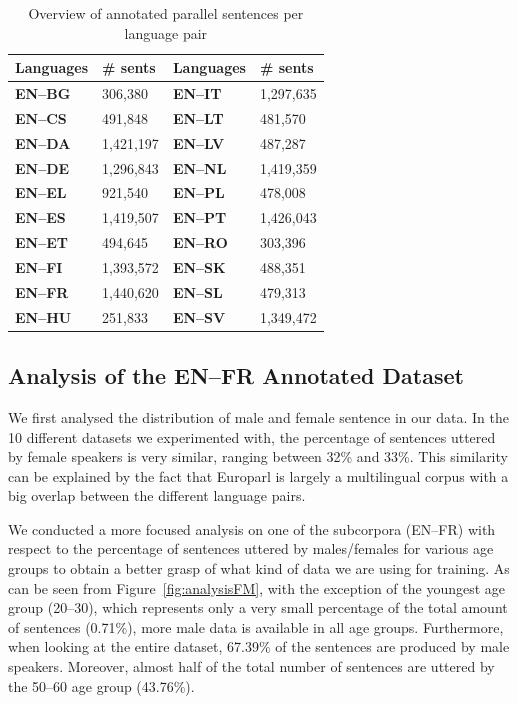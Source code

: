 \begin{table}[h!]
\centering
\footnotesize\begin{tabular}{|ll|ll|}
\hline
\bf{Languages}  &   \bf{\# sents}    &  \bf{Languages}  &   \bf{\# sents}   \\ \hline
\bf{EN--BG}	&	306,380	    &   \bf{EN--IT}	&	1,297,635	\\ \hline
\bf{EN--CS}	&	491,848	    &	\bf{EN--LT}	&	481,570	    \\ \hline
\bf{EN--DA}	&	1,421,197	&	\bf{EN--LV}	&	487,287	    \\ \hline
\bf{EN--DE} &	1,296,843	&	\bf{EN--NL}	&	1,419,359	\\ \hline
\bf{EN--EL}	&	921,540	    &	\bf{EN--PL}	&	478,008	    \\ \hline
\bf{EN--ES}	&	1,419,507	&	\bf{EN--PT}	&	1,426,043	\\ \hline
\bf{EN--ET}	&	494,645	    &	\bf{EN--RO}	&	303,396	    \\ \hline
\bf{EN--FI} &	1,393,572	&	\bf{EN--SK}	&	488,351	    \\ \hline
\bf{EN--FR}	&	1,440,620	&	\bf{EN--SL}	&	479,313	    \\ \hline
\bf{EN--HU}	&	251,833	    &	\bf{EN--SV}	&	1,349,472	\\ \hline

\end{tabular}
\caption{Overview of annotated parallel sentences per language pair}\label{tbl:numberSents}
\end{table}

\subsection{Analysis of the EN--FR Annotated Dataset}

We first analysed the distribution of male and female sentence in our data. In the 10 different datasets we experimented with, the percentage of sentences uttered by female speakers is very similar, ranging between 32\% and 33\%. This similarity can be explained by the fact that Europarl is largely a multilingual corpus with a big overlap between the different language pairs.

We conducted a more focused analysis on one of the subcorpora (EN--FR) with respect to the percentage of sentences uttered by males/females for various age groups to obtain a better grasp of what kind of data we are using for training. As can be seen from Figure~\ref{fig:analysisFM}, with the exception of the youngest age group (20--30), which represents only a very small percentage of the total amount of sentences (0.71\%), more male data is available in all age groups. Furthermore, when looking at the entire dataset, 67.39\% of the sentences are produced by male speakers. Moreover, almost half of the total number of sentences are uttered by the 50--60 age group (43.76\%). 


